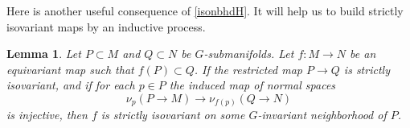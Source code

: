 \documentclass[11pt]{amsart}
\newtheorem{lem}{Lemma}[section]
\theoremstyle{definition}
\numberwithin{equation}{section}
\numberwithin{figure}{section}
\newcommand{\R}{\mathbb R}
\newcommand{\ti}{\widetilde}
\begin{document}
%
%
%
%

Here is another useful consequence of \autoref{isonbhdH}. It will help us to build strictly isovariant maps by an inductive process.
\begin{lem}\label{rank_isovariant_condition}
Let $P\subset M$ and $Q\subset N$ be $G$-submanifolds. Let $f\colon M\to N$ be an equivariant map such that $f(P)\subset Q$. If the restricted map $P\to Q$ is strictly isovariant, and if for each $p\in P$ the induced map of normal spaces
\[ \nu_p(P \to M) \to \nu_{f(p)}(Q \to N) \]
is injective, then $f$ is strictly isovariant on some $G$-invariant neighborhood of $P$.
\end{lem}
\end{document}
